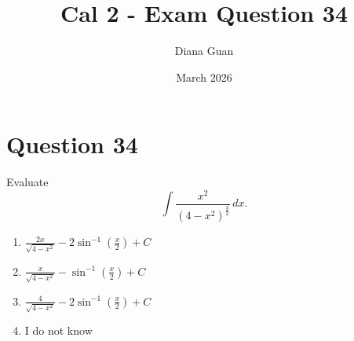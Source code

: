 \documentclass{article}
\title{\textbf{Cal 2 - Exam Question 34}}
\author{Diana Guan}
\date{March 2026}
\newcommand{\questionanchor}[1]{\hypertarget{q:#1}{}}
\begin{document}
\maketitle

    \questionanchor{34}
    \section*{Question 34}
    Evaluate
    \[
    \int \frac{x^2}{(4-x^2)^{\frac{3}{2}}}\, dx.
    \]
    
    \begin{enumerate}[label = \alph*.]
        \item $\displaystyle \frac{2x}{\sqrt{4-x^2}} - 2\sin^{-1}\!\left(\frac{x}{2}\right) + C$
        \item $\displaystyle \frac{x}{\sqrt{4-x^2}} - \sin^{-1}\!\left(\frac{x}{2}\right) + C$
        \item $\displaystyle \frac{4}{\sqrt{4-x^2}} - 2\sin^{-1}\!\left(\frac{x}{2}\right) + C$
        \item I do not know
    \end{enumerate}
\end{document}
